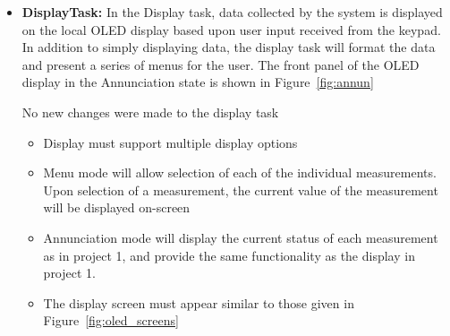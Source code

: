 \documentclass[12pt]{article} %
\begin{document}
\begin{itemize}
	\item \textbf{DisplayTask: }
		In the Display task, data collected by the system is
		displayed on the local OLED display based upon user input received from
		the keypad. In addition to simply displaying data, the display task will
		format the data and present a series of menus for the user. The front
		panel of the OLED display in the Annunciation state is shown in
		Figure~\ref{fig:annun}

		No new changes were made to the display task
		\begin{itemize}
			\item Display must support multiple display options
			\item Menu mode will allow selection of each of the individual
				measurements. Upon selection of a measurement, the current value of the
				measurement will be displayed on-screen
			\item Annunciation mode will display the current status of each
				measurement as in project 1, and provide the same functionality as the
				display in project 1.
			\item The display screen must appear similar to those given in Figure~\ref{fig:oled_screens}

		\end{itemize}



\end{itemize}
\end{document}
